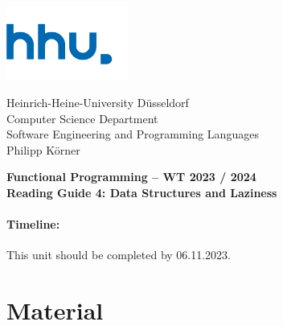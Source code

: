 \documentclass[11pt,a4paper]{article}
\begin{document}
	
	\begin{minipage}[b]{\textwidth}
		\parbox[t]{5cm}{%
			\includegraphics[width=4cm]{unilogo}
			\hfill
		}
		\parbox[b]{11cm}{%
			Heinrich-Heine-University D\"usseldorf\\
			Computer Science Department\\
			Software Engineering and Programming Languages\\
			Philipp K\"orner
		}
	\end{minipage}
\begin{center}
	\bf
	Functional Programming -- WT 2023 / 2024\\
	Reading Guide 4: Data Structures and Laziness
\end{center}

\pagestyle{empty}

\paragraph{Timeline:} This unit should be completed by 06.11.2023.

\section{Material} 
\end{document}
